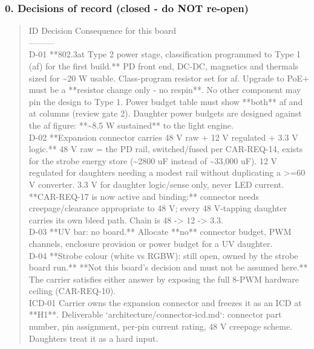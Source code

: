 \documentclass[11pt,a4paper]{article}
\begin{document}
\subsubsection*{0. Decisions of record (closed - do NOT re-open)}
\begin{quote}\small\ttfamily\raggedright
\textbar{} ID \textbar{} Decision \textbar{} Consequence for this board \textbar{}\\
\textbar{}---\textbar{}---\textbar{}---\textbar{}\\
\textbar{} D-01 \textbar{} {*}{*}802.3at Type 2 power stage, classification programmed to Type 1 (af) for the first build.{*}{*} \textbar{} PD front end, DC-DC, magnetics and thermals sized for \textasciitilde{}20 W usable. Class-program resistor set for af. Upgrade to PoE+ must be a {*}{*}resistor change only - no respin{*}{*}. No other component may pin the design to Type 1. Power budget table must show {*}{*}both{*}{*} af and at columns (review gate 2). Daughter power budgets are designed against the af figure: {*}{*}\textasciitilde{}8.5 W sustained{*}{*} to the light engine. \textbar{}\\
\textbar{} D-02 \textbar{} {*}{*}Expansion connector carries 48 V raw + 12 V regulated + 3.3 V logic.{*}{*} \textbar{} 48 V raw = the PD rail, switched/fused per CAR-REQ-14, exists for the strobe energy store (\textasciitilde{}2800 uF instead of \textasciitilde{}33,000 uF). 12 V regulated for daughters needing a modest rail without duplicating a \textgreater{}=60 V converter. 3.3 V for daughter logic/sense only, never LED current. {*}{*}CAR-REQ-17 is now active and binding:{*}{*} connector needs creepage/clearance appropriate to 48 V; every 48 V-tapping daughter carries its own bleed path. Chain is 48 -\textgreater{} 12 -\textgreater{} 3.3. \textbar{}\\
\textbar{} D-03 \textbar{} {*}{*}UV bar: no board.{*}{*} \textbar{} Allocate {*}{*}no{*}{*} connector budget, PWM channels, enclosure provision or power budget for a UV daughter. \textbar{}\\
\textbar{} D-04 \textbar{} {*}{*}Strobe colour (white vs RGBW): still open, owned by the strobe board run.{*}{*} \textbar{} {*}{*}Not this board's decision and must not be assumed here.{*}{*} The carrier satisfies either answer by exposing the full 8-PWM hardware ceiling (CAR-REQ-10). \textbar{}\\
\textbar{} ICD-01 \textbar{} Carrier owns the expansion connector and freezes it as an ICD at {*}{*}H1{*}{*}. \textbar{} Deliverable `architecture/connector-icd.md`: connector part number, pin assignment, per-pin current rating, 48 V creepage scheme. Daughters treat it as a hard input. \textbar{}\\

\end{quote}
\end{document}
